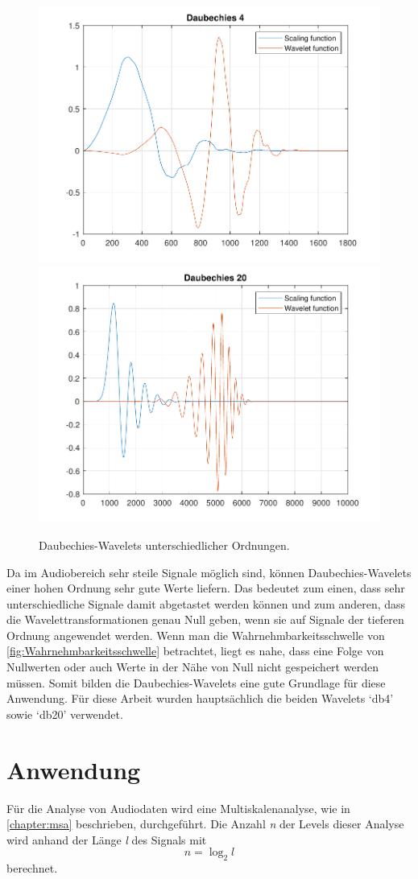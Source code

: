 \begin{refsection}
\begin{figure}
	\includegraphics[width=0.5\linewidth]{papers/compress/Bilder/db4}
	\includegraphics[width=0.5\linewidth]{papers/compress/Bilder/db20}
	\label{fig:dbN}
	\caption{Daubechies-Wavelets unterschiedlicher Ordnungen.}
\end{figure}

Da im Audiobereich sehr steile Signale möglich sind, können Daubechies-Wavelets einer hohen Ordnung sehr gute Werte liefern.
Das bedeutet zum einen, dass sehr unterschiedliche Signale damit abgetastet werden können und zum anderen, dass die Wavelettransformationen genau Null geben, wenn sie auf Signale der tieferen Ordnung angewendet werden.
Wenn man die Wahrnehmbarkeitsschwelle von \autoref{fig:Wahrnehmbarkeitsschwelle} betrachtet, liegt es nahe, dass eine Folge von Nullwerten oder auch Werte in der Nähe von Null nicht gespeichert werden müssen.
Somit bilden die Daubechies-Wavelets eine gute Grundlage für diese Anwendung.
Für diese Arbeit wurden hauptsächlich die beiden Wavelets `db4' sowie `db20' verwendet.

\section{Anwendung}
Für die Analyse von Audiodaten wird eine Multiskalenanalyse, wie in \autoref{chapter:msa} beschrieben, durchgeführt.
Die Anzahl \textit{n} der Levels dieser Analyse wird anhand der Länge \textit{l} des Signals mit
\begin{equation}
\textit{n} = \log_2{\textit{l}}
\end{equation}
berechnet.


\end{refsection}
